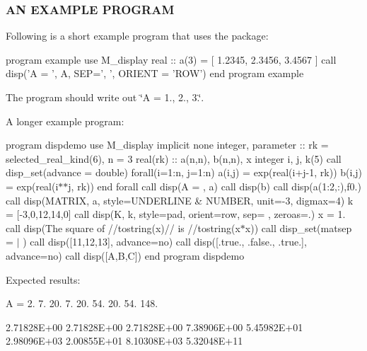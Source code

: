 \subsubsection*{AN E\+X\+A\+M\+P\+LE P\+R\+O\+G\+R\+AM}

Following is a short example program that uses the package\+: \begin{DoxyVerb}  program example
    use M_display
    real :: a(3) = [ 1.2345, 2.3456, 3.4567 ]
    call disp('A = ', A, SEP=', ', ORIENT = 'ROW')
  end program example
\end{DoxyVerb}


The program should write out \char`\"{}\+A = 1., 2., 3.\char`\"{}.

A longer example program\+:

program dispdemo use M\+\_\+display implicit none integer, parameter \+:\+: rk = selected\+\_\+real\+\_\+kind(6), n = 3 real(rk) \+:\+: a(n,n), b(n,n), x integer i, j, k(5) call disp\+\_\+set(advance = \textquotesingle{}double\textquotesingle{}) forall(i=1\+:n, j=1\+:n) a(i,j) = exp(real(i+j-\/1, rk)) b(i,j) = exp(real(i$\ast$$\ast$j, rk)) end forall call disp(\textquotesingle{}A = \textquotesingle{}, a) call disp(b) call disp(a(1\+:2,\+:),\textquotesingle{}f0.\textquotesingle{}) call disp(\textquotesingle{}M\+A\+T\+R\+IX\textquotesingle{}, a, style=\textquotesingle{}U\+N\+D\+E\+R\+L\+I\+NE \& N\+U\+M\+B\+ER\textquotesingle{}, unit=-\/3, digmax=4) k = \mbox{[}-\/3,0,12,14,0\mbox{]} call disp(\textquotesingle{}K\textquotesingle{}, k, style=\textquotesingle{}pad\textquotesingle{}, orient=\textquotesingle{}row\textquotesingle{}, sep=\textquotesingle{} \textquotesingle{}, zeroas=\textquotesingle{}.\textquotesingle{}) x = 1. call disp(\textquotesingle{}The square of \textquotesingle{}//tostring(x)//\textquotesingle{} is \textquotesingle{}//tostring(x$\ast$x)) call disp\+\_\+set(matsep = \textquotesingle{} $\vert$ \textquotesingle{}) call disp(\mbox{[}11,12,13\mbox{]}, advance=\textquotesingle{}no\textquotesingle{}) call disp(\mbox{[}.true., .false., .true.\mbox{]}, advance=\textquotesingle{}no\textquotesingle{}) call disp(\mbox{[}\textquotesingle{}A\textquotesingle{},\textquotesingle{}B\textquotesingle{},\textquotesingle{}C\textquotesingle{}\mbox{]}) end program dispdemo

Expected results\+:

A = 2. 7. 20. 7. 20. 54. 20. 54. 148.

2.\+71828E+00 2.\+71828E+00 2.\+71828E+00 7.\+38906E+00 5.\+45982E+01 2.\+98096E+03 2.\+00855E+01 8.\+10308E+03 5.\+32048E+11

